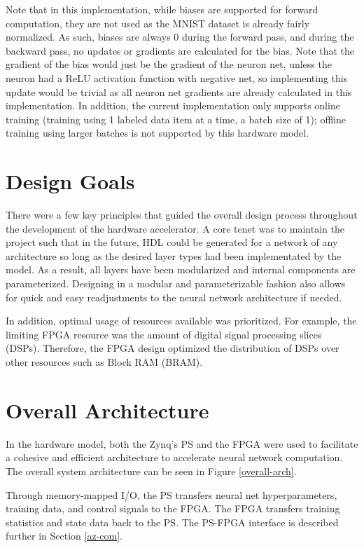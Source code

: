 Note that in this implementation, while biases are supported for forward computation, they are not used as the MNIST dataset is already fairly normalized. As such, biases are always 0 during the forward pass, and during the backward pass, no updates or gradients are calculated for the bias. Note that the gradient of the bias would just be the gradient of the neuron net, unless the neuron had a ReLU activation function with negative net, so implementing this update would be trivial as all neuron net gradients are already calculated in this implementation. In addition, the current implementation only supports online training (training using 1 labeled data item at a time, a batch size of 1); offline training using larger batches is not supported by this hardware model.


\section{Design Goals}
There were a few key principles that guided the overall design process throughout the development of the hardware accelerator. A core tenet was to maintain the project such that in the future, HDL could be generated for a network of any architecture so long as the desired layer types had been implementated by the model. As a result, all layers have been modularized and internal components are parameterized. Designing in a modular and parameterizable fashion also allows for quick and easy readjustments to the neural network architecture if needed.
\par 
In addition, optimal usage of resources available was prioritized. For example, the limiting FPGA resource was the amount of digital signal processing slices (DSPs). Therefore, the FPGA design optimized the distribution of DSPs over other resources such as Block RAM (BRAM).

\section{Overall Architecture}
In the hardware model, both the Zynq's PS and the FPGA were used to facilitate a cohesive and efficient architecture to accelerate neural network computation. The overall system architecture can be seen in Figure \ref{overall-arch}. 

Through memory-mapped I/O, the PS transfers neural net hyperparameters, training data, and control signals to the FPGA. The FPGA transfers training statistics and state data back to the PS. The PS-FPGA interface is described further in Section \ref{az-com}.

